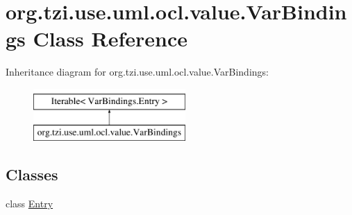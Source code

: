\hypertarget{classorg_1_1tzi_1_1use_1_1uml_1_1ocl_1_1value_1_1_var_bindings}{\section{org.\-tzi.\-use.\-uml.\-ocl.\-value.\-Var\-Bindings Class Reference}
\label{classorg_1_1tzi_1_1use_1_1uml_1_1ocl_1_1value_1_1_var_bindings}
}
Inheritance diagram for org.\-tzi.\-use.\-uml.\-ocl.\-value.\-Var\-Bindings\-:\begin{figure}[H]
\begin{center}
\leavevmode
\includegraphics[height=2.000000cm]{classorg_1_1tzi_1_1use_1_1uml_1_1ocl_1_1value_1_1_var_bindings}
\end{center}
\end{figure}
\subsection*{Classes}
\begin{DoxyCompactItemize}
\item 
class \hyperlink{classorg_1_1tzi_1_1use_1_1uml_1_1ocl_1_1value_1_1_var_bindings_1_1_entry}{Entry}
\end{DoxyCompactItemize}
